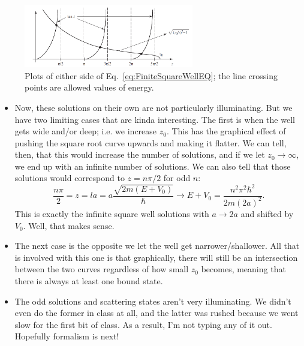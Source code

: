 \begin{figure}[ht]
    \centering
    \includegraphics[width=0.66\textwidth]{./res/Pics/FiniteSquareWellEvenEnergies.png}
    \caption{Plots of either side of Eq.~\eqref{eq:FiniteSquareWellEQ}; the line crossing points are allowed values of energy.}
    \label{fig:FiniteSquareWellEvenEnergies}
\end{figure}



\begin{itemize}
    \item Now, these solutions on their own are not particularly illuminating. But we have two limiting cases that are kinda interesting. The first is when the well gets wide and/or deep; i.e. we increase $z_0$. This has the graphical effect of pushing the square root curve upwards and making it flatter. We can tell, then, that this would increase the number of solutions, and if we let $z_0 \rightarrow \infty$, we end up with an infinite number of solutions. We can also tell that those solutions would correspond to $z=n\pi/2$ for odd $n$:
        \begin{equation*}
            \frac{n\pi}{2} = z = la = a\frac{\sqrt{2m(E+V_0)}}{\hbar} \rightarrow E+V_0 = \frac{n^2\pi^2\hbar^2}{2m(2a)^2}.
        \end{equation*}
        This is exactly the infinite square well solutions with $a \rightarrow 2a$ and shifted by $V_0$. Well, that makes sense.
    \item The next case is the opposite we let the well get narrower/shallower. All that is involved with this one is that graphically, there will still be an intersection between the two curves regardless of how small $z_0$ becomes, meaning that there is always at least one bound state.
\end{itemize}

\begin{itemize}
    \item The odd solutions and scattering states aren't very illuminating. We didn't even do the former in class at all, and the latter was rushed because we went slow for the first bit of class. As a result, I'm not typing any of it out. Hopefully formalism is next!
\end{itemize}
